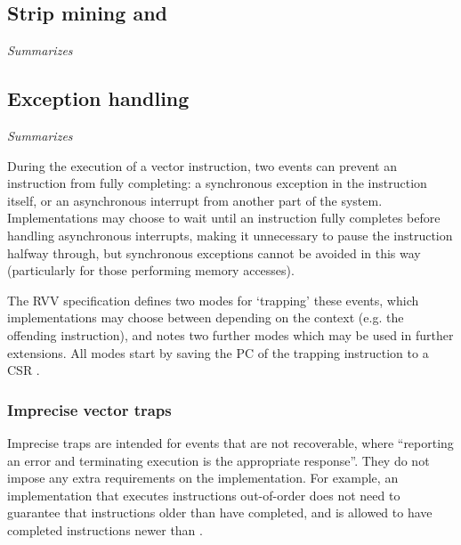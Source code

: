 \subsection{Strip mining and }\label{chap:bg:sec:rvv:vsetvl}
\emph{Summarizes \cite[Section 6]{RISCVVectorExtension2021}}

\pagebreak
\subsection{Exception handling}
\emph{Summarizes \cite[Section 17]{RISCVVectorExtension2021}}

During the execution of a vector instruction, two events can prevent an instruction from fully completing: a synchronous exception in the instruction itself, or an asynchronous interrupt from another part of the system.
Implementations may choose to wait until an instruction fully completes before handling asynchronous interrupts, making it unnecessary to pause the instruction halfway through, but synchronous exceptions cannot be avoided in this way (particularly for those performing memory accesses).

The RVV specification defines two modes for `trapping' these events, which implementations may choose between depending on the context (e.g. the offending instruction), and notes two further modes which may be used in further extensions.
All modes start by saving the PC of the trapping instruction to a CSR .

\subsubsection{Imprecise vector traps}
Imprecise traps are intended for events that are not recoverable, where \enquote{reporting an error and terminating execution is the appropriate response}.
They do not impose any extra requirements on the implementation.
For example, an implementation that executes instructions out-of-order does not need to guarantee that instructions older than  have completed, and is allowed to have completed instructions newer than .

